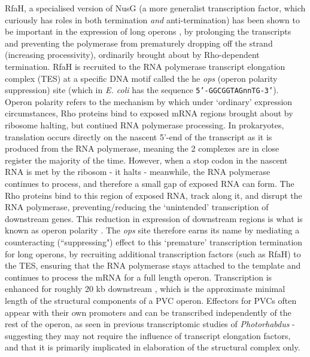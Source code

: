 RfaH, a specialised version of NusG (a more generalist transcription factor, which curiously has roles in both termination \emph{and} anti-termination) has been shown to be important in the expression of long operons \citep{Bailey1996}, by prolonging the transcripts and preventing the polymerase from prematurely dropping off the strand (increasing processivity), ordinarily brought about by Rho-dependent termination. RfaH is recruited to the RNA polymerase transcript elongation complex (TES) at a specific DNA motif called the he \emph{ops} (operon polarity suppression) site (which in \emph{E. coli} has the sequence \texttt{5'-GGCGGTAGnnTG-3'}). Operon polarity refers to the mechanism by which under `ordinary' expression circumstances, Rho proteins bind to exposed mRNA regions brought about by ribosome halting, but contiued RNA polymerase processing. In prokaryotes, translation occurs directly on the nascent 5'-end of the transcript as it is produced from the RNA polymerase, meaning the 2 complexes are in close register the majority of the time. However, when a stop codon in the nascent RNA is met by the ribosom - it halts - meanwhile, the RNA polymerase continues to process, and therefore a small gap of exposed RNA can form. The Rho proteins bind to this region of exposed RNA, track along it, and disrupt the RNA polymerase, preventing/reducing the `unintended' transcription of downstream genes. This reduction in expression of downstream regions is what is known as operon polarity \citep{Santangelo2008, Adhya1974, Banerjee2006, Nudler2002}. The \emph{ops} site therefore earns its name by mediating a counteracting (``suppressing") effect to this `premature' transcription termination for long operons, by recruiting additional transcription factors (such as RfaH) to the TES, ensuring that the RNA polymerase stays attached to the template and continues to process the mRNA for a full length operon. Transcription is enhanced for roughly 20 kb downstream \citep{Artsimovitch2002, Leeds1996, Leeds1997}, which is the approximate minimal length of the structural components of a PVC operon. Effectors for PVCs often appear with their own promoters and can be transcribed independently of the rest of the operon, as seen in previous transcriptomic studies of \emph{Photorhabdus} - suggesting they may not require the influence of transcript elongation factors, and that it is primarily implicated in elaboration of the structural complex only.


